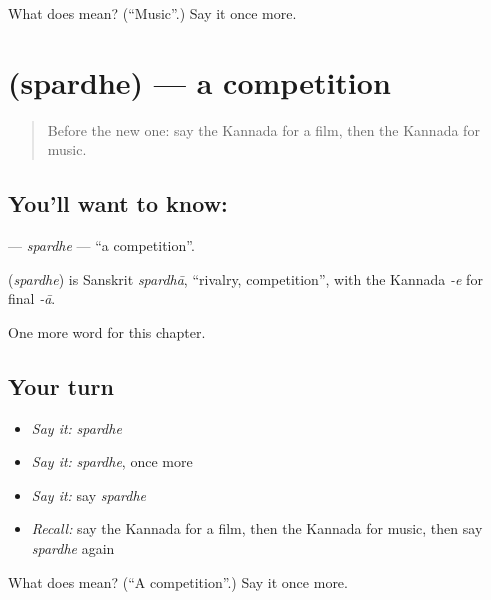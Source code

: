\begin{tcolorbox}[breakable,colback=teal!4,colframe=teal!35!black,title={Before you move on}]
What does  mean? (\textquotedblleft{}Music\textquotedblright{}.) Say it once more.
\end{tcolorbox}
\section[\texorpdfstring{\kn{ಸ್ಪರ್ಧೆ} (spardhe)}{ಸ್ಪರ್ಧೆ (spardhe)}]{ (spardhe) — a competition}

\label{lesson:KA-C298-spardhe}



\begin{quote}
Before the new one: say the Kannada for a film, then the Kannada for music.
\end{quote}

\subsection*{You'll want to know: }
\textbf{} — \emph{spardhe} — \textquotedblleft{}a competition\textquotedblright{}.

\begin{cousinweb}
\textbf{} (\emph{spardhe}) is Sanskrit \emph{spardhā}, \textquotedblleft{}rivalry, competition\textquotedblright{}, with the Kannada \emph{-e} for final \emph{-ā}.
\end{cousinweb}

\begin{grammarlens}[title={What you've built}]
One more word for this chapter.
\end{grammarlens}

\subsection*{Your turn}
\begin{itemize}
\raggedright
  \item \emph{Say it:} \emph{spardhe}
  \item \emph{Say it:} \emph{spardhe}, once more
  \item \emph{Say it:} say \emph{spardhe}
  \item \emph{Recall:} say the Kannada for a film, then the Kannada for music, then say \emph{spardhe} again
\end{itemize}

\begin{tcolorbox}[breakable,colback=teal!4,colframe=teal!35!black,title={Before you move on}]
What does  mean? (\textquotedblleft{}A competition\textquotedblright{}.) Say it once more.
\end{tcolorbox}
